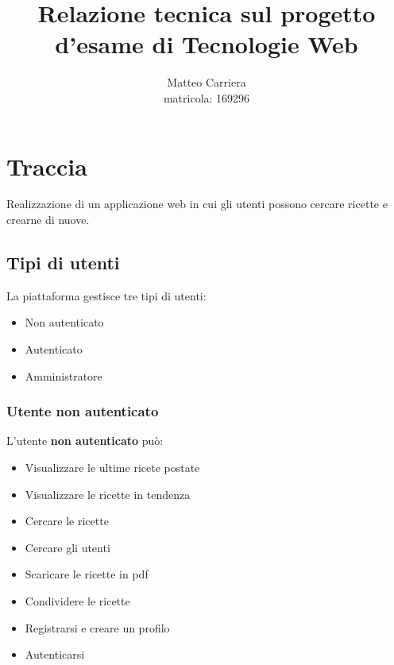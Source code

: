 \documentclass[a4paper]{article}
\author{Matteo Carriera \\ matricola: 169296}
\title{Relazione tecnica sul progetto d'esame di Tecnologie Web}
\begin{document}
    \maketitle


    \newpage
    \tableofcontents


    \newpage
    \section{Traccia}
        Realizzazione di un applicazione web in cui gli utenti 
        possono cercare ricette e crearne di nuove.
        
        
        \subsection{Tipi di utenti}
            La piattaforma gestisce tre tipi di utenti:
            
            \begin{itemize}
                \item Non autenticato
                \item Autenticato
                \item Amministratore
            \end{itemize} 
            
            
            \subsubsection{Utente non autenticato}
                L'utente \textbf{non autenticato} può:
                \begin{itemize}
                    \item Visualizzare le ultime ricete postate
                    \item Visualizzare le ricette in tendenza
                    \item Cercare le ricette
                    \item Cercare gli utenti
                    \item Scaricare le ricette in pdf
                    \item Condividere le ricette
                    \item Registrarsi e creare un profilo
                    \item Autenticarsi
                \end{itemize} 
            
            
\end{document}
